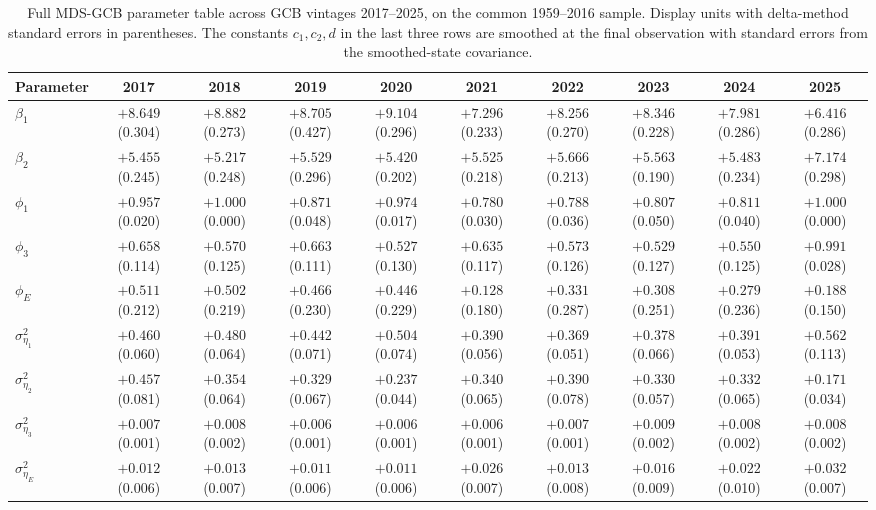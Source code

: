 \begin{landscape}
\begin{table}[p]
  \centering
  \scriptsize
  \caption{Full MDS-GCB parameter table across GCB vintages 2017--2025, on the common 1959--2016 sample. Display units with delta-method standard errors in parentheses. The constants $c_1, c_2, d$ in the last three rows are smoothed at the final observation with standard errors from the smoothed-state covariance.}
  \label{tab:jrssa_full_vintages}
  \begin{tabular}{lccccccccc}
    \toprule
    Parameter & 2017 & 2018 & 2019 & 2020 & 2021 & 2022 & 2023 & 2024 & 2025 \\
    \midrule
    $\beta_1$ & $+8.649$ (0.304) & $+8.882$ (0.273) & $+8.705$ (0.427) & $+9.104$ (0.296) & $+7.296$ (0.233) & $+8.256$ (0.270) & $+8.346$ (0.228) & $+7.981$ (0.286) & $+6.416$ (0.286) \\
    $\beta_2$ & $+5.455$ (0.245) & $+5.217$ (0.248) & $+5.529$ (0.296) & $+5.420$ (0.202) & $+5.525$ (0.218) & $+5.666$ (0.213) & $+5.563$ (0.190) & $+5.483$ (0.234) & $+7.174$ (0.298) \\
    $\phi_1$ & $+0.957$ (0.020) & $+1.000$ (0.000) & $+0.871$ (0.048) & $+0.974$ (0.017) & $+0.780$ (0.030) & $+0.788$ (0.036) & $+0.807$ (0.050) & $+0.811$ (0.040) & $+1.000$ (0.000) \\
    $\phi_3$ & $+0.658$ (0.114) & $+0.570$ (0.125) & $+0.663$ (0.111) & $+0.527$ (0.130) & $+0.635$ (0.117) & $+0.573$ (0.126) & $+0.529$ (0.127) & $+0.550$ (0.125) & $+0.991$ (0.028) \\
    $\phi_E$ & $+0.511$ (0.212) & $+0.502$ (0.219) & $+0.466$ (0.230) & $+0.446$ (0.229) & $+0.128$ (0.180) & $+0.331$ (0.287) & $+0.308$ (0.251) & $+0.279$ (0.236) & $+0.188$ (0.150) \\
    $\sigma^2_{\eta_1}$ & $+0.460$ (0.060) & $+0.480$ (0.064) & $+0.442$ (0.071) & $+0.504$ (0.074) & $+0.390$ (0.056) & $+0.369$ (0.051) & $+0.378$ (0.066) & $+0.391$ (0.053) & $+0.562$ (0.113) \\
    $\sigma^2_{\eta_2}$ & $+0.457$ (0.081) & $+0.354$ (0.064) & $+0.329$ (0.067) & $+0.237$ (0.044) & $+0.340$ (0.065) & $+0.390$ (0.078) & $+0.330$ (0.057) & $+0.332$ (0.065) & $+0.171$ (0.034) \\
    $\sigma^2_{\eta_3}$ & $+0.007$ (0.001) & $+0.008$ (0.002) & $+0.006$ (0.001) & $+0.006$ (0.001) & $+0.006$ (0.001) & $+0.007$ (0.001) & $+0.009$ (0.002) & $+0.008$ (0.002) & $+0.008$ (0.002) \\
    $\sigma^2_{\eta_E}$ & $+0.012$ (0.006) & $+0.013$ (0.007) & $+0.011$ (0.006) & $+0.011$ (0.006) & $+0.026$ (0.007) & $+0.013$ (0.008) & $+0.016$ (0.009) & $+0.022$ (0.010) & $+0.032$ (0.007) \\

\end{tabular}
\end{table}
\end{landscape}
